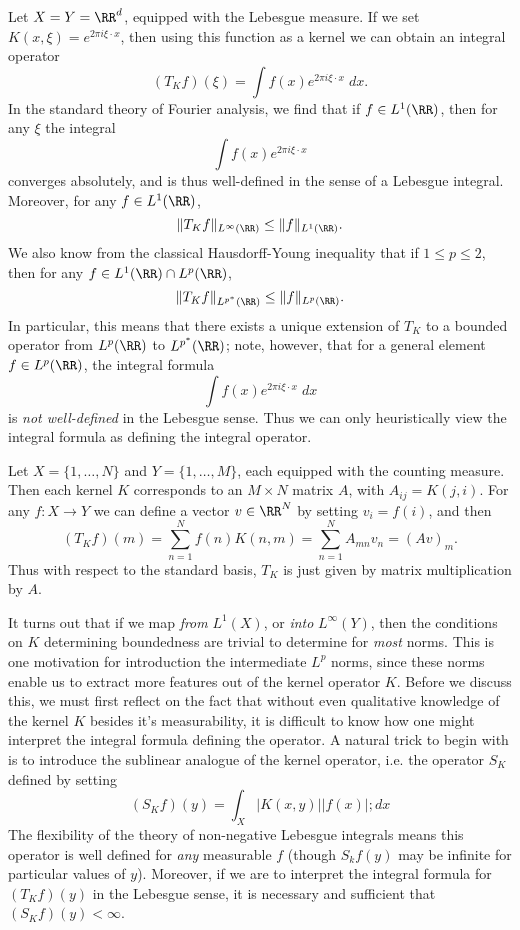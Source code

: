 \begin{example}
  Let $X = Y = \RR^d$, equipped with the Lebesgue measure. If we set $K(x,\xi) = e^{2 \pi i \xi \cdot x}$, then using this function as a kernel we can obtain an integral operator
  \[ (T_K f)(\xi) = \int f(x) e^{2 \pi i \xi \cdot x}\; dx. \]
  In the standard theory of Fourier analysis, we find that if $f \in L^1(\RR)$, then for any $\xi$ the integral
  \[ \int f(x) e^{2 \pi i \xi \cdot x} \]
  converges absolutely, and is thus well-defined in the sense of a Lebesgue integral. Moreover, for any $f \in L^1(\RR)$,
  \[ \| T_K f \|_{L^\infty(\RR)} \leq \| f \|_{L^1(\RR)}. \]
  We also know from the classical Hausdorff-Young inequality that if $1 \leq p \leq 2$, then for any $f \in L^1(\RR) \cap L^p(\RR)$,
  \[ \| T_K f \|_{L^{p^*}(\RR)} \leq \| f \|_{L^p(\RR)}. \]
  In particular, this means that there exists a unique extension of $T_K$ to a bounded operator from $L^p(\RR)$ to $L^{p^*}(\RR)$; note, however, that for a general element $f \in L^p(\RR)$, the integral formula
  \[ \int f(x) e^{2 \pi i \xi \cdot x}\; dx \]
  is \emph{not well-defined} in the Lebesgue sense. Thus we can only heuristically view the integral formula as defining the integral operator.
\end{example}

\begin{example}
  Let $X = \{ 1, \dots, N \}$ and $Y = \{ 1, \dots, M \}$, each equipped with the counting measure. Then each kernel $K$ corresponds to an $M \times N$ matrix $A$, with $A_{ij} = K(j,i)$. For any $f: X \to Y$ we can define a vector $v \in \RR^N$ by setting $v_i = f(i)$, and then
  \[ (T_K f)(m) = \sum_{n = 1}^N f(n) K(n,m) = \sum_{n = 1}^N A_{mn} v_n = (Av)_m. \]
  Thus with respect to the standard basis, $T_K$ is just given by matrix multiplication by $A$.
\end{example}

It turns out that if we map \emph{from} $L^1(X)$, or \emph{into} $L^\infty(Y)$, then the conditions on $K$ determining boundedness are trivial to determine for \emph{most} norms. This is one motivation for introduction the intermediate $L^p$ norms, since these norms enable us to extract more features out of the kernel operator $K$. Before we discuss this, we must first reflect on the fact that without even qualitative knowledge of the kernel $K$ besides it's measurability, it is difficult to know how one might interpret the integral formula defining the operator. A natural trick to begin with is to introduce the sublinear analogue of the kernel operator, i.e. the operator $S_K$ defined by setting
%
\[ (S_K f)(y) = \int_X |K(x,y)| |f(x)|; dx \]
%
The flexibility of the theory of non-negative Lebesgue integrals means this operator is well defined for \emph{any} measurable $f$ (though $S_k f(y)$ may be infinite for particular values of $y$). Moreover, if we are to interpret the integral formula for $(T_K f)(y)$ in the Lebesgue sense, it is necessary and sufficient that $(S_K f)(y) < \infty$.

